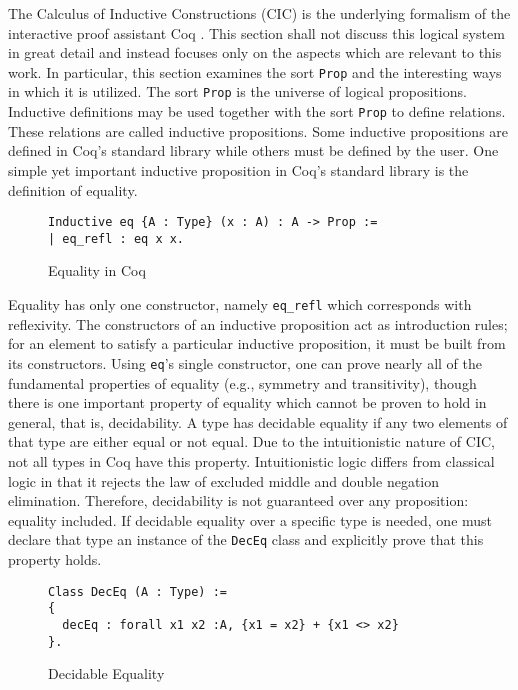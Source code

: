 The Calculus of Inductive Constructions (CIC) is the underlying formalism of the interactive proof assistant Coq \cite{CIC}. This section shall not discuss this logical system in great detail and instead focuses only on the aspects which are relevant to this work. In particular, this section examines the sort \verb|Prop| and the interesting ways in which it is utilized. The sort \verb|Prop| is the universe of logical propositions. Inductive definitions may be used together with the sort \verb|Prop| to define relations. These relations are called inductive propositions. Some inductive propositions are defined in Coq's standard library while others must be defined by the user. One simple yet important inductive proposition in Coq's standard library is the definition of equality. 
\begin{figure}[h]
\begin{lstlisting}[language=Coq]
Inductive eq {A : Type} (x : A) : A -> Prop :=
| eq_refl : eq x x.
\end{lstlisting}
\caption{Equality in Coq}
\end{figure}
Equality has only one constructor, namely \verb|eq_refl| which corresponds with reflexivity. The constructors of an inductive proposition act as introduction rules; for an element to satisfy a particular inductive proposition, it must be built from its constructors. Using \verb|eq|'s single constructor, one can prove nearly all of the fundamental properties of equality (e.g., symmetry and transitivity), though there is one important property of equality which cannot be proven to hold in general, that is, decidability. 
A type has decidable equality if any two elements of that type are either equal or not equal. Due to the intuitionistic nature of CIC, not all types in Coq have this property. Intuitionistic logic differs from classical logic in that it rejects the law of excluded middle and double negation elimination. Therefore, decidability is not guaranteed over any proposition: equality included. If decidable equality over a specific type is needed, one must declare that type an instance of the \verb|DecEq| class and explicitly prove that this property holds.
\begin{figure}[h]
\begin{lstlisting}[language=Coq]
Class DecEq (A : Type) := 
{ 
  decEq : forall x1 x2 :A, {x1 = x2} + {x1 <> x2} 
}.
\end{lstlisting}
\caption{Decidable Equality}
\end{figure}

